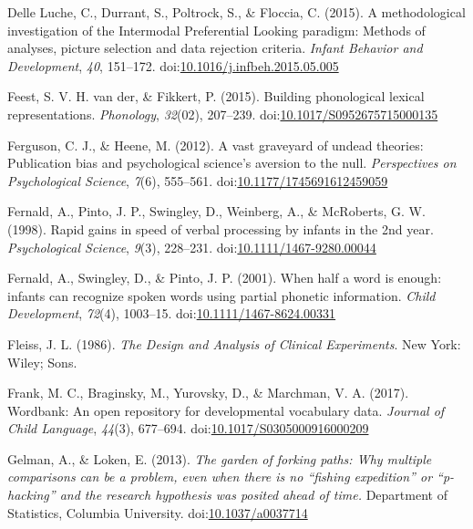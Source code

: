 \documentclass[man]{apa6}
\theoremstyle{definition}
\theoremstyle{definition}
\theoremstyle{definition}
\theoremstyle{remark}
\begin{document}
\hypertarget{ref-DelleLuche2015}{}
Delle Luche, C., Durrant, S., Poltrock, S., \& Floccia, C. (2015). A
methodological investigation of the Intermodal Preferential Looking
paradigm: Methods of analyses, picture selection and data rejection
criteria. \emph{Infant Behavior and Development}, \emph{40}, 151--172.
doi:\href{https://doi.org/10.1016/j.infbeh.2015.05.005}{10.1016/j.infbeh.2015.05.005}

\hypertarget{ref-vanderFeest2015}{}
Feest, S. V. H. van der, \& Fikkert, P. (2015). Building phonological
lexical representations. \emph{Phonology}, \emph{32}(02), 207--239.
doi:\href{https://doi.org/10.1017/S0952675715000135}{10.1017/S0952675715000135}

\hypertarget{ref-Ferguson2012}{}
Ferguson, C. J., \& Heene, M. (2012). A vast graveyard of undead
theories: Publication bias and psychological science's aversion to the
null. \emph{Perspectives on Psychological Science}, \emph{7}(6),
555--561.
doi:\href{https://doi.org/10.1177/1745691612459059}{10.1177/1745691612459059}

\hypertarget{ref-Fernald1998}{}
Fernald, A., Pinto, J. P., Swingley, D., Weinberg, A., \& McRoberts, G.
W. (1998). Rapid gains in speed of verbal processing by infants in the
2nd year. \emph{Psychological Science}, \emph{9}(3), 228--231.
doi:\href{https://doi.org/10.1111/1467-9280.00044}{10.1111/1467-9280.00044}

\hypertarget{ref-Fernald2001a}{}
Fernald, A., Swingley, D., \& Pinto, J. P. (2001). When half a word is
enough: infants can recognize spoken words using partial phonetic
information. \emph{Child Development}, \emph{72}(4), 1003--15.
doi:\href{https://doi.org/10.1111/1467-8624.00331}{10.1111/1467-8624.00331}

\hypertarget{ref-Fleiss1986}{}
Fleiss, J. L. (1986). \emph{The Design and Analysis of Clinical
Experiments}. New York: Wiley; Sons.

\hypertarget{ref-Frank2017}{}
Frank, M. C., Braginsky, M., Yurovsky, D., \& Marchman, V. A. (2017).
Wordbank: An open repository for developmental vocabulary data.
\emph{Journal of Child Language}, \emph{44}(3), 677--694.
doi:\href{https://doi.org/10.1017/S0305000916000209}{10.1017/S0305000916000209}

\hypertarget{ref-Gelman2013}{}
Gelman, A., \& Loken, E. (2013). \emph{The garden of forking paths: Why
multiple comparisons can be a problem, even when there is no ``fishing
expedition'' or ``p-hacking'' and the research hypothesis was posited
ahead of time.} Department of Statistics, Columbia University.
doi:\href{https://doi.org/10.1037/a0037714}{10.1037/a0037714}
\end{document}

